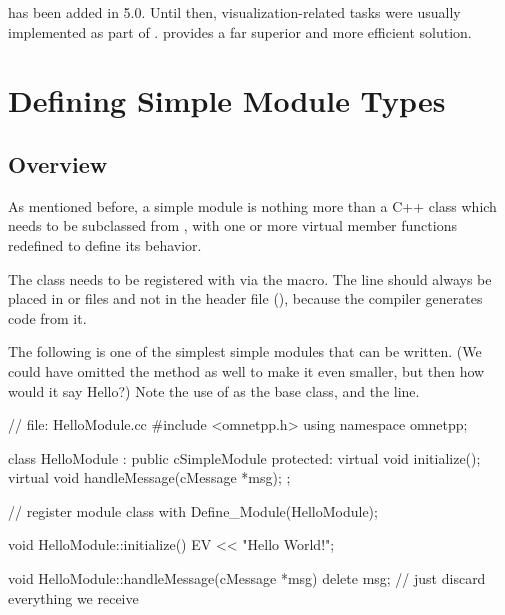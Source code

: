 \begin{note}
     has been added in {\opp} 5.0. Until then,
    visualization-related tasks were usually implemented as part of
    .  provides
    a far superior and more efficient solution.
\end{note}


\section{Defining Simple Module Types}
\label{sec:simple-modules:defining-simple-modules}

\subsection{Overview}
\label{sec:simple-modules:defining:overview}

As mentioned before, a simple module is nothing more
than a C++ class which needs to be subclassed from ,
with one or more virtual member functions redefined to define its behavior.

The class needs to be registered with {\opp} via the  macro.
The  line should always be placed in  or 
files and not in the header file (), because the compiler generates code from it.

The following  is one of the simplest simple modules that can be written.
(We could have omitted the  method as well to make it even smaller,
but then how would it say Hello?) Note the use of  as the base class,
and the  line.

\begin{cpp}
// file: HelloModule.cc
#include <omnetpp.h>
using namespace omnetpp;

class HelloModule : public cSimpleModule
{
  protected:
    virtual void initialize();
    virtual void handleMessage(cMessage *msg);
};

// register module class with {\opp}
Define_Module(HelloModule);

void HelloModule::initialize()
{
    EV << "Hello World!\n";
}

void HelloModule::handleMessage(cMessage *msg)
{
    delete msg; // just discard everything we receive
}
\end{cpp}

